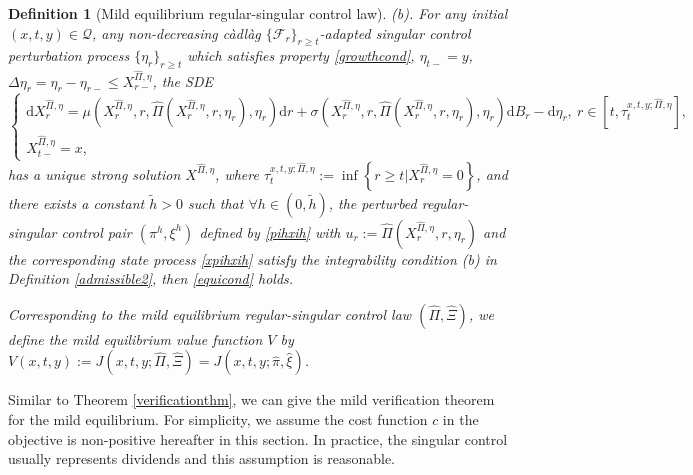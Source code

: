 \documentclass[11pt,reqno]{article}%
\newtheorem{definition}[theorem]{Definition}
\numberwithin{equation}{section}
\begin{document}
\begin{definition}[Mild equilibrium regular-singular control law]
(b). For any initial $(x,t,y)\in\mathcal{Q}$, any non-decreasing c\`{a}dl\`{a}g $\{\mathcal{F}_{r}\}_{r\ge t}$-adapted singular control perturbation process $\{\eta_{r}\} _{r\ge t}$ which satisfies property \eqref{growthcond}, $\eta_{t-}=y$, $\Delta \eta_r=\eta_r-\eta_{r-}\le X_{r-}^{\hat\Pi,\eta}$, the SDE
\begin{equation}
\left\{\begin{array}{l}
\mathrm{d}X^{\hat{\Pi},\eta}_{r}=\mu\left(X^{\hat{\Pi},\eta}_{r},r,\hat{\Pi}\left(X^{\hat{\Pi},\eta}_{r},r,\eta_{r}\right),\eta_{r}\right)\mathrm{d}r+\sigma\left(X^{\hat{\Pi},\eta}_{r},r,\hat{\Pi}\left(X^{\hat{\Pi},\eta}_{r},r,\eta_{r}\right),\eta_{r}\right)\mathrm{d}B_{r}-\mathrm{d}\eta_{r},\ r\in[t,\tau^{x,t,y;\hat{\Pi},\eta}_{t}],\\
X^{\hat{\Pi},\eta}_{t-}=x,
\end{array}\right.\nonumber
\end{equation}
has a unique strong solution $X^{\hat{\Pi},\eta}$, where $\tau^{x,t,y;\hat{\Pi},\eta}_{t}:=\inf\left\{r\ge t|X^{\hat{\Pi},\eta}_{r}= 0\right\}$, and there exists a constant $\tilde{h}>0$ such that $\forall h\in(0,\tilde{h})$, the perturbed regular-singular control pair $\left(\pi^{h},\xi^{h}\right)$ defined by \eqref{pihxih} with $u_{r}:=\hat{\Pi}(X^{\hat{\Pi},\eta}_{r},r,\eta_{r})$ and the corresponding state process \eqref{xpihxih} satisfy the integrability condition (b) in Definition \ref{admissible2}, then \eqref{equicond} holds.

 Corresponding to the mild equilibrium regular-singular control law $\left(\hat{\Pi},\hat{\Xi}\right)$, we define the mild equilibrium value function $V$ by $V(x,t,y):=J\left(x,t,y;\hat{\Pi},\hat{\Xi}\right)=J\left(x,t,y;\hat{\pi},\hat{\xi}\right)$.
\end{definition}



Similar to Theorem \ref{verificationthm}, we can give the mild verification theorem for the mild equilibrium. For simplicity, we assume the cost function $c$ in the objective is non-positive hereafter in this section. In practice, the singular control usually represents dividends and this assumption is reasonable. 
\end{document}
